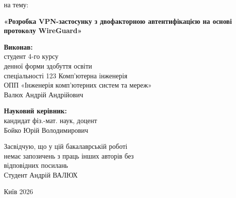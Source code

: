 \begin{titlepage}
\begin{center}
\vspace{0.2cm}

на тему:

\vspace{0.2cm}

\textbf{«Розробка VPN-застосунку з двофакторною автентифікацією на основі протоколу WireGuard»}
\end{center}

\vspace{0.2cm}

\noindent
\textbf{Виконав:}\\
студент 4-го курсу\\
денної форми здобуття освіти\\
спеціальності 123 Комп'ютерна інженерія\\
ОПП «Інженерія комп'ютерних систем та мереж»\\
Валюх Андрій Андрійович \underline{\hspace{4cm}}

\vspace{0.6cm}

\noindent
\textbf{Науковий керівник:}\\
кандидат фіз.-мат. наук, доцент\\
Бойко Юрій Володимирович \underline{\hspace{4cm}}

\vspace{0.6cm}

\noindent
Засвідчую, що у цій бакалаврській роботі\\
немає запозичень з праць інших авторів без\\
відповідних посилань\\
Студент \underline{\hspace{4cm}} Андрій ВАЛЮХ

\vspace{0.6cm}

\vfill

\begin{center}
Київ 2026
\end{center}

\end{titlepage}
\fi
